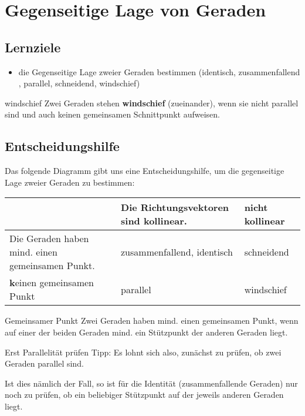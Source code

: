 \section{Gegenseitige Lage von Geraden}

\subsection*{Lernziele}
\begin{itemize}
  \item die Gegenseitige Lage zweier Geraden bestimmen (identisch,
    zusammenfallend
    ,
    parallel,
    schneidend, windschief)
\end{itemize}


\begin{definition}{windschief}{}
  Zwei Geraden stehen \textbf{windschief} (zueinander), wenn sie nicht
  parallel sind und auch keinen gemeinsamen Schnittpunkt aufweisen.
\end{definition}

\subsection{Entscheidungshilfe}
Das folgende Diagramm gibt uns eine Entscheidungshilfe, um die
gegenseitige Lage zweier Geraden zu bestimmen:

\vspace{3mm}

\begin{tabular}{p{60mm}|p{50mm}|p{50mm}}
  & Die Richtungsvektoren sind kollinear. &  \textbf{nicht} kollinear\\\hline
Die Geraden haben mind. einen gemeinsamen Punkt.  & zusammenfallend, identisch& schneidend\\\hline
\textbf{k}einen gemeinsamen Punkt & parallel & windschief
\end{tabular}


\begin{bemerkung}{Gemeinsamer Punkt}{}
  Zwei Geraden haben mind. einen gemeinsamen Punkt, wenn auf einer der
  beiden Geraden mind. ein Stützpunkt der anderen Geraden liegt.  
\end{bemerkung}

\begin{bemerkung}{Erst Parallelität prüfen}{}
Tipp: Es lohnt sich also, zunächst zu prüfen, ob zwei Geraden parallel
sind.

Ist dies nämlich der Fall, so ist für die Identität (zusammenfallende
Geraden) nur noch zu prüfen, ob ein beliebiger Stützpunkt auf der
jeweils anderen Geraden liegt.
\end{bemerkung}




